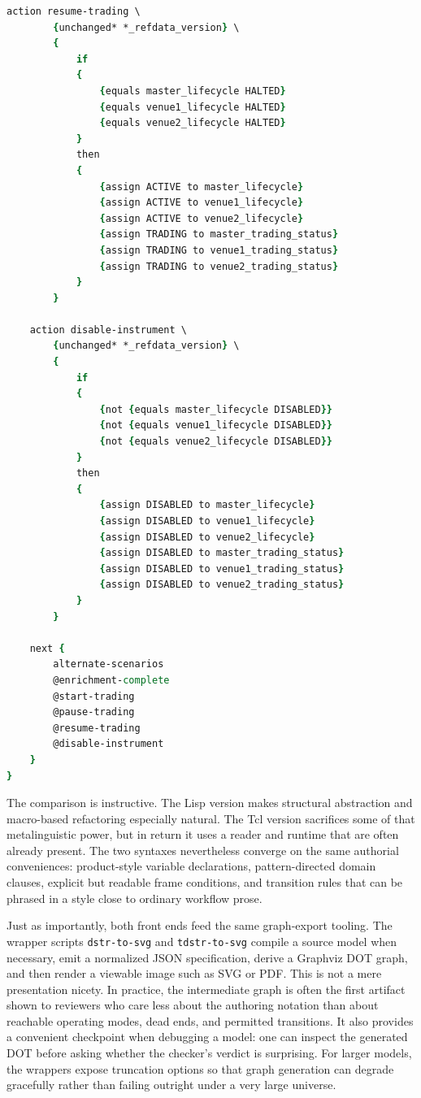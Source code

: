 \documentclass[11pt]{article}
\begin{document}
\begin{lstlisting}[language=tcl]
    action resume-trading \
        {unchanged* *_refdata_version} \
        {
            if
            {
                {equals master_lifecycle HALTED}
                {equals venue1_lifecycle HALTED}
                {equals venue2_lifecycle HALTED}
            }
            then
            {
                {assign ACTIVE to master_lifecycle}
                {assign ACTIVE to venue1_lifecycle}
                {assign ACTIVE to venue2_lifecycle}
                {assign TRADING to master_trading_status}
                {assign TRADING to venue1_trading_status}
                {assign TRADING to venue2_trading_status}
            }
        }

    action disable-instrument \
        {unchanged* *_refdata_version} \
        {
            if
            {
                {not {equals master_lifecycle DISABLED}}
                {not {equals venue1_lifecycle DISABLED}}
                {not {equals venue2_lifecycle DISABLED}}
            }
            then
            {
                {assign DISABLED to master_lifecycle}
                {assign DISABLED to venue1_lifecycle}
                {assign DISABLED to venue2_lifecycle}
                {assign DISABLED to master_trading_status}
                {assign DISABLED to venue1_trading_status}
                {assign DISABLED to venue2_trading_status}
            }
        }

    next {
        alternate-scenarios
        @enrichment-complete
        @start-trading
        @pause-trading
        @resume-trading
        @disable-instrument
    }
}
\end{lstlisting}

The comparison is instructive. The Lisp version makes structural abstraction
and macro-based refactoring especially natural. The Tcl version sacrifices some
of that metalinguistic power, but in return it uses a reader and runtime that
are often already present. The two syntaxes nevertheless converge on the same
authorial conveniences: product-style variable declarations, pattern-directed
domain clauses, explicit but readable frame conditions, and transition rules
that can be phrased in a style close to ordinary workflow prose.

Just as importantly, both front ends feed the same graph-export tooling. The
wrapper scripts \texttt{dstr-to-svg} and \texttt{tdstr-to-svg} compile a source
model when necessary, emit a normalized JSON specification, derive a Graphviz
DOT graph, and then render a viewable image such as SVG or PDF. This is not a
mere presentation nicety. In practice, the intermediate graph is often the
first artifact shown to reviewers who care less about the authoring notation
than about reachable operating modes, dead ends, and permitted transitions. It
also provides a convenient checkpoint when debugging a model: one can inspect
the generated DOT before asking whether the checker's verdict is surprising.
For larger models, the wrappers expose truncation options so that graph
generation can degrade gracefully rather than failing outright under a very
large universe.
\end{document}
